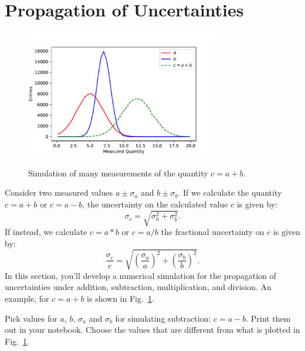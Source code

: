 \section{Propagation of Uncertainties}

\begin{figure}[htbp]
\begin{center}
\includegraphics[width=0.75\textwidth]{figs/labs/uncertainties/addunc.pdf}\\
\end{center}
\caption{\label{fig:addunc} Simulation of many measurements of the quantity $c = a + b$. }
\end{figure}

Consider two measured values $a \pm \sigma_a$ and $b \pm \sigma_b$.  If we calculate the quantity $c = a + b$ or $c = a - b$, the uncertainty on the calculated value $c$ is given by:
\begin{displaymath}
\sigma_c = \sqrt{\sigma_a^2 + \sigma_b^2}.
\end{displaymath}
If instead, we calculate $c = a * b$ or $c = a/b$ the fractional uncertainty on $c$ is given by:
\begin{displaymath}
\frac{\sigma_c}{c} = \sqrt{\left(\frac{\sigma_a}{a}\right)^2 + \left(\frac{\sigma_b}{b}\right)^2}.
\end{displaymath}
In this section, you'll develop a numerical simulation for the
propagation of uncertainties under addition, subtraction,
multiplication, and division.  An example, for $c = a + b$ is shown in Fig.~\ref{fig:addunc}.

\begin{print} Pick values for $a$, $b$, $ \sigma_a$ and $ \sigma_b$ for simulating subtraction: $c=a-b$. Print them out in your notebook. Choose the values that are different from what is plotted in Fig.~\ref{fig:addunc}.  \end{print}

